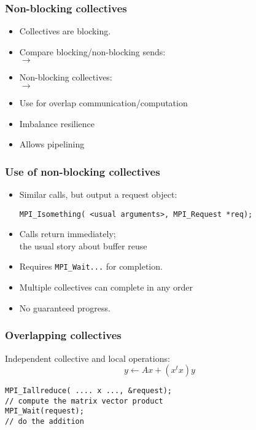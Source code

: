 \begin{frame}[containsverbatim]\frametitle{Non-blocking collectives}
\label{sl:coll-nonblock-intro}
\begin{itemize}
\item Collectives are blocking.
\item Compare blocking/non-blocking sends:\\
   $\rightarrow$ 
\item Non-blocking collectives:\\
   $\rightarrow$ 
\item Use for overlap communication/computation
\item Imbalance resilience
\item Allows pipelining
\end{itemize}
\end{frame}

\begin{frame}[containsverbatim]\frametitle{Use of non-blocking collectives}
\begin{itemize}
\item Similar calls, but output a request object:
\begin{lstlisting}
MPI_Isomething( <usual arguments>, MPI_Request *req);
\end{lstlisting}
\item Calls return immediately;\\
  the usual story about buffer reuse
\item Requires \lstinline{MPI_Wait}\texttt{...} for completion.
\item Multiple collectives can complete in any order
\item No guaranteed progress.
\end{itemize}
\end{frame}


\begin{frame}[containsverbatim]\frametitle{Overlapping collectives}
Independent collective and local operations:
\[ y \leftarrow Ax + (x^tx)y \]
\begin{lstlisting}
MPI_Iallreduce( .... x ..., &request);
// compute the matrix vector product
MPI_Wait(request);
// do the addition
\end{lstlisting}
\end{frame}

\begin{exerciseframe}[procgridnonblock]
\hyperlink{exprocgrid}{}


\end{exerciseframe}

